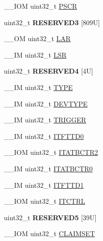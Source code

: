 \begin{DoxyCompactItemize}
\+\_\+\+\_\+\+I\+OM uint32\+\_\+t \hyperlink{struct_t_p_i___type_ad092e61fccb6752d3f4adbbd4a7e1567}{P\+S\+CR}
\item 
\mbox{\label{struct_t_p_i___type_a66322e42ec57eff3e05991b7701f29e1}} 
uint32\+\_\+t {\bfseries R\+E\+S\+E\+R\+V\+E\+D3} \mbox{[}809\+U\mbox{]}
\item 
\+\_\+\+\_\+\+OM uint32\+\_\+t \hyperlink{struct_t_p_i___type_ae3a3197c7be6ce07b50fd87cbb02f319}{L\+AR}
\item 
\+\_\+\+\_\+\+IM uint32\+\_\+t \hyperlink{struct_t_p_i___type_af5373794b1c024b28a2a59a9eab6498e}{L\+SR}
\item 
\mbox{\label{struct_t_p_i___type_acf52c485ef7661b09ce63a4f3dc0b879}} 
uint32\+\_\+t {\bfseries R\+E\+S\+E\+R\+V\+E\+D4} \mbox{[}4\+U\mbox{]}
\item 
\+\_\+\+\_\+\+IM uint32\+\_\+t \hyperlink{struct_t_p_i___type_a01972f64f408cec28320780ca067b142}{T\+Y\+PE}
\item 
\+\_\+\+\_\+\+IM uint32\+\_\+t \hyperlink{struct_t_p_i___type_ad98855854a719bbea33061e71529a472}{D\+E\+V\+T\+Y\+PE}
\item 
\+\_\+\+\_\+\+IM uint32\+\_\+t \hyperlink{struct_t_p_i___type_a4d4cd2357f72333a82a1313228287bbd}{T\+R\+I\+G\+G\+ER}
\item 
\+\_\+\+\_\+\+IM uint32\+\_\+t \hyperlink{struct_t_p_i___type_a4c53b48c6bb49037c97742136d14b4f7}{I\+T\+F\+T\+T\+D0}
\item 
\+\_\+\+\_\+\+I\+OM uint32\+\_\+t \hyperlink{struct_t_p_i___type_ab358319b969d3fed0f89bbe33e9f1652}{I\+T\+A\+T\+B\+C\+T\+R2}
\item 
\+\_\+\+\_\+\+IM uint32\+\_\+t \hyperlink{struct_t_p_i___type_aaa573b2e073e76e93c51ecec79c616d0}{I\+T\+A\+T\+B\+C\+T\+R0}
\item 
\+\_\+\+\_\+\+IM uint32\+\_\+t \hyperlink{struct_t_p_i___type_aaf0447dd4b2c16dc1db1e2172c9dac8f}{I\+T\+F\+T\+T\+D1}
\item 
\+\_\+\+\_\+\+I\+OM uint32\+\_\+t \hyperlink{struct_t_p_i___type_aaa4c823c10f115f7517c82ef86a5a68d}{I\+T\+C\+T\+RL}
\item 
\mbox{\label{struct_t_p_i___type_a9c1ac143e09b64b1f6eb92ecd65d60d0}} 
uint32\+\_\+t {\bfseries R\+E\+S\+E\+R\+V\+E\+D5} \mbox{[}39\+U\mbox{]}
\item 
\+\_\+\+\_\+\+I\+OM uint32\+\_\+t \hyperlink{struct_t_p_i___type_af8b7d15fa5252b733dd4b11fa1b5730a}{C\+L\+A\+I\+M\+S\+ET}

\end{DoxyCompactItemize}
